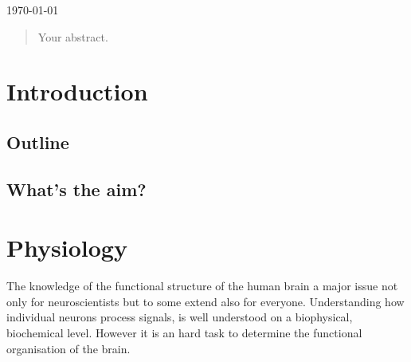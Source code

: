\begin{titlepage}

{\large \today}\\[2cm] %


 

\vfill %

\end{titlepage}

\begin{abstract}
Your abstract.
\end{abstract}

\tableofcontents

\section{Introduction}
\label{sec:intro}

\subsection{Outline}
\subsection{What's the aim?}

\section{Physiology}
The knowledge of the functional structure of the human brain a major issue not only for neuroscientists but to some extend also for everyone.
Understanding how individual neurons process signals, is well understood on a biophysical, biochemical level.\cite[xxx]{guyton}
However it is an hard task to determine the functional organisation of the brain.

